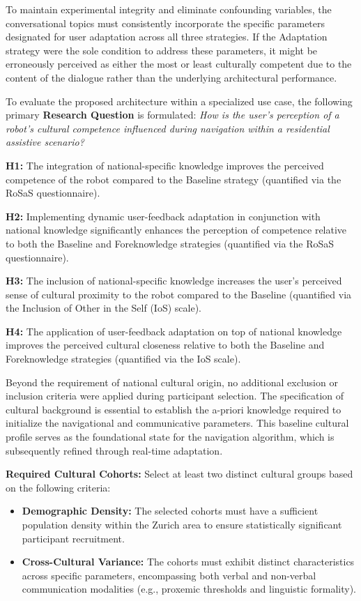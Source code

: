 To maintain experimental integrity and eliminate confounding variables, the conversational topics must consistently incorporate the specific parameters designated for user adaptation across all three strategies. 
If the Adaptation strategy were the sole condition to address these parameters, it might be erroneously perceived as either the most or least culturally competent due to the content of the dialogue rather than the underlying architectural performance.

To evaluate the proposed architecture within a specialized use case, the following primary \textbf{Research Question} is formulated:
\textit{How is the user’s perception of a robot's cultural competence influenced during navigation within a residential assistive scenario?}

\vspace{1em}
\noindent
\textbf{H1: } The integration of national-specific knowledge improves the perceived competence of the robot compared to the Baseline strategy (quantified via the RoSaS questionnaire).

\noindent
\textbf{H2: } Implementing dynamic user-feedback adaptation in conjunction with national knowledge significantly enhances the perception of competence relative to both the Baseline and Foreknowledge strategies (quantified via the RoSaS questionnaire).

\noindent
\textbf{H3: } The inclusion of national-specific knowledge increases the user's perceived sense of cultural proximity to the robot compared to the Baseline (quantified via the Inclusion of Other in the Self (IoS) scale).

\noindent
\textbf{H4: } The application of user-feedback adaptation on top of national knowledge improves the perceived cultural closeness relative to both the Baseline and Foreknowledge strategies (quantified via the IoS scale).

Beyond the requirement of national cultural origin, no additional exclusion or inclusion criteria were applied during participant selection. 
The specification of cultural background is essential to establish the a-priori knowledge required to initialize the navigational and communicative parameters. 
This baseline cultural profile serves as the foundational state for the navigation algorithm, which is subsequently refined through real-time adaptation.

\textbf{Required Cultural Cohorts:} Select at least two distinct cultural groups based on the following criteria:
\begin{itemize}
\item \textbf{Demographic Density:} The selected cohorts must have a sufficient population density within the Zurich area to ensure statistically significant participant recruitment.
\item \textbf{Cross-Cultural Variance:} The cohorts must exhibit distinct characteristics across specific parameters, encompassing both verbal and non-verbal communication modalities (e.g., proxemic thresholds and linguistic formality).
\end{itemize}

